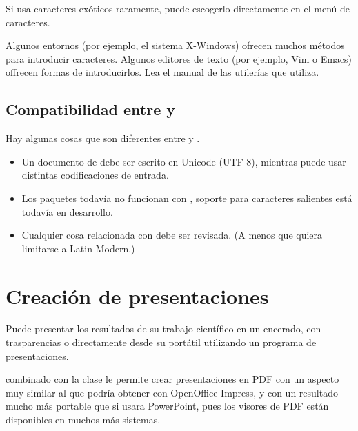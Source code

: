 
Si usa caracteres exóticos raramente, puede escogerlo directamente en el menú de caracteres.


Algunos entornos (por ejemplo, el sistema X-Windows) ofrecen muchos métodos para introducir caracteres. Algunos editores de texto (por ejemplo, Vim o Emacs) offrecen formas de introducirlos. 
Lea el manual de las utilerías que utiliza.

\subsection{Compatibilidad entre  y }

Hay algunas cosas que son diferentes entre  y .

\begin{itemize}
  \item Un documento de  debe ser escrito en Unicode (UTF-8), mientras  puede usar distintas codificaciones de entrada.
  \item Los paquetes  todavía no funcionan con ,
  soporte para caracteres salientes está todavía en desarrollo.
\item Cualquier cosa relacionada con \fontsnomo{} debe ser revisada. (A menos que quiera limitarse a Latin Modern.) 
\end{itemize}

\section{Creación de presentaciones}
\label{sec:beamer}

Puede presentar los resultados de su trabajo científico en un encerado, con trasparencias o directamente desde su \computernomo{} portátil utilizando un programa de presentaciones.

 combinado con la clase  le permite crear presentaciones en PDF con un aspecto muy similar al que podría obtener con OpenOffice Impress, y con un resultado mucho más portable que si usara PowerPoint, pues los visores de PDF están disponibles en muchos más sistemas.

